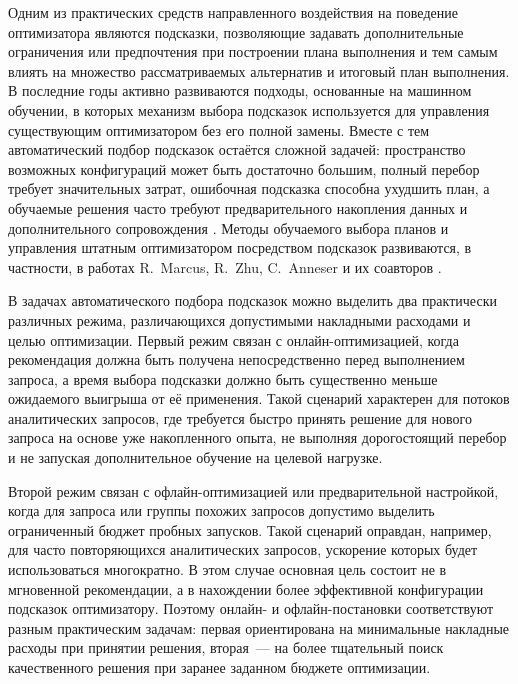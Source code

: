 
Одним из практических средств направленного воздействия на поведение оптимизатора являются подсказки, позволяющие задавать дополнительные ограничения или предпочтения при построении плана выполнения и тем самым влиять на множество рассматриваемых альтернатив и итоговый план выполнения. В последние годы активно развиваются подходы, основанные на машинном обучении, в которых механизм выбора подсказок используется для управления существующим оптимизатором без его полной замены. Вместе с тем автоматический подбор подсказок остаётся сложной задачей: пространство возможных конфигураций может быть достаточно большим, полный перебор требует значительных затрат, ошибочная подсказка способна ухудшить план, а обучаемые решения часто требуют предварительного накопления данных и дополнительного сопровождения \cite{10.1145/3448016.3452838, zhu2023lero}. Методы обучаемого выбора планов и управления штатным оптимизатором посредством подсказок развиваются, в частности, в работах R.~Marcus, R.~Zhu, C.~Anneser и их соавторов \cite{10.1145/3448016.3452838,zhu2023lero,anneser2023autosteer}.

В задачах автоматического подбора подсказок можно выделить два практически различных режима, различающихся допустимыми накладными расходами и целью оптимизации. Первый режим связан с онлайн-оптимизацией, когда рекомендация должна быть получена непосредственно перед выполнением запроса, а время выбора подсказки должно быть существенно меньше ожидаемого выигрыша от её применения. Такой сценарий характерен для потоков аналитических запросов, где требуется быстро принять решение для нового запроса на основе уже накопленного опыта, не выполняя дорогостоящий перебор и не запуская дополнительное обучение на целевой нагрузке. 

Второй режим связан с офлайн-оптимизацией или предварительной настройкой, когда для запроса или группы похожих запросов допустимо выделить ограниченный бюджет пробных запусков. Такой сценарий оправдан, например, для часто повторяющихся аналитических запросов, ускорение которых будет использоваться многократно. В этом случае основная цель состоит не в мгновенной рекомендации, а в нахождении более эффективной конфигурации подсказок оптимизатору. Поэтому онлайн- и офлайн-постановки соответствуют разным практическим задачам: первая ориентирована на минимальные накладные расходы при принятии решения, вторая~--- на более тщательный поиск качественного решения при заранее заданном бюджете оптимизации.

